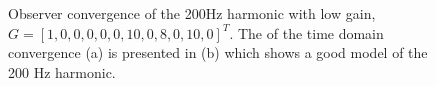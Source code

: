 \begin{figure}[h!]
  \centering %
  \qquad
  \caption{\label{fig:ph_lowgain} Observer convergence of the 200Hz harmonic with low gain, $G = [1, 0, 0, 0, 0, 0, 10, 0, 8, 0, 10, 0]^T$. The \abbrFFT of the time domain convergence (a) is presented in (b) which shows a good model of the 200 Hz harmonic.}
\end{figure}

